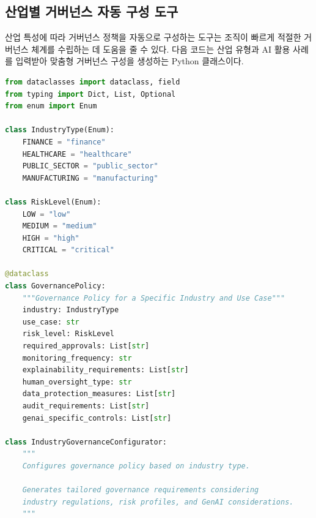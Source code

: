 \subsection{산업별 거버넌스 자동 구성 도구}
\label{sec:5.5.2}

산업 특성에 따라 거버넌스 정책을 자동으로 구성하는 도구는
조직이 빠르게 적절한 거버넌스 체계를 수립하는 데 도움을 줄 수 있다.
다음 코드는 산업 유형과 AI 활용 사례를 입력받아
맞춤형 거버넌스 구성을 생성하는 Python 클래스이다.

\begin{lstlisting}[language=Python, caption={Industry-Specific AI Governance Configurator}, label={lst:governance_configurator}]
from dataclasses import dataclass, field
from typing import Dict, List, Optional
from enum import Enum

class IndustryType(Enum):
    FINANCE = "finance"
    HEALTHCARE = "healthcare"
    PUBLIC_SECTOR = "public_sector"
    MANUFACTURING = "manufacturing"

class RiskLevel(Enum):
    LOW = "low"
    MEDIUM = "medium"
    HIGH = "high"
    CRITICAL = "critical"

@dataclass
class GovernancePolicy:
    """Governance Policy for a Specific Industry and Use Case"""
    industry: IndustryType
    use_case: str
    risk_level: RiskLevel
    required_approvals: List[str]
    monitoring_frequency: str
    explainability_requirements: List[str]
    human_oversight_type: str
    data_protection_measures: List[str]
    audit_requirements: List[str]
    genai_specific_controls: List[str]

class IndustryGovernanceConfigurator:
    """
    Configures governance policy based on industry type.

    Generates tailored governance requirements considering
    industry regulations, risk profiles, and GenAI considerations.
    """


\end{lstlisting}
